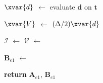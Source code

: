 \begin{algorithm}
\begin{algorithmic}[1]
\State $\xvar{d}$ $\gets$ evaluate $\bm{d}$ on $\bm{t}$

\State $\xvar{V}$ $\gets$ $(\Delta/2) \xvar{d}$ 

\State $\mathcal{I}$ $\gets$ 
\State $\mathcal{V}$ $\gets$ 

\EndFor

\State $\mathbf{B}_{e1}$ $\gets$  

\State \textbf{return} $\mathbf{A}_{e1}$, $\mathbf{B}_{e1}$ 

\end{algorithmic}
\end{algorithm}